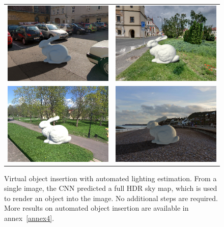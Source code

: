 \begin{figure}[!th]
    \centering
    \footnotesize
    \setlength{\tabcolsep}{1pt}
    \begin{tabular}{cc}
    \includegraphics[width=.47\linewidth]{./figures/renders/netout/pano_aaafspbtffjzbn_jpg-1_png_out.png} &
    \includegraphics[width=.47\linewidth]{./figures/renders/netout/pano_abauwcbvavypmw_jpg-2_png_out.png} \\
    \includegraphics[width=.47\linewidth]{./figures/renders/netout/pano_ajmdcorvpbtdcb_jpg-3_png_out.png} &
    \includegraphics[width=.47\linewidth]{./figures/renders/netout/pano_ajwnburtukssxf_jpg-5_png_out.png}
    \end{tabular}
    \caption[Virtual object insertion with authomated lighting estimation]{Virtual object insertion with automated lighting estimation. From a single image, the CNN predicted a full HDR sky map, which is used to render an object into the image. No additional steps are required. More results on automated object insertion are available in annex~\ref{annex4}.}
    \label{fig:evaluation_render_examples}
\end{figure}

